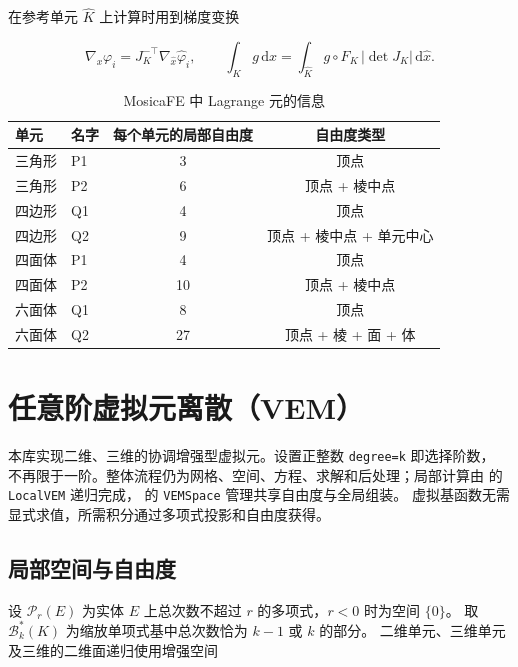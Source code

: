 \documentclass[UTF8,11pt,oneside]{ctexbook}
\theoremstyle{definition}
\theoremstyle{plain}
\newcommand{\mosica}{\textsf{MosicaFE}}
\newcommand{\code}[1]{\texttt{#1}}
\newcommand{\dif}{\,\mathrm{d}}
\begin{document}
在参考单元 $\hat K$ 上计算时用到梯度变换

\begin{equation}
\nabla_x\varphi_i = J_K^{-\top}\nabla_{\hat x}\hat\varphi_i,
\qquad
\int_K g\dif x=\int_{\hat K}g\circ F_K\,|\det J_K|\dif\hat x .
\label{eq:transform}
\end{equation}

\begin{table}[htbp]
\centering
\caption{\mosica{} 中 Lagrange 元的信息}
\label{tab:lagrange}
\begin{lrbox}{\guideTableBox}
\begin{tabular}{@{}llcc@{}}
\toprule
单元 & 名字 & 每个单元的局部自由度 & 自由度类型 \\
\midrule
三角形 & P1 & 3 & 顶点 \\
三角形 & P2 & 6 & 顶点 + 棱中点 \\
四边形 & Q1 & 4 & 顶点 \\
四边形 & Q2 & 9 & 顶点 + 棱中点 + 单元中心 \\
四面体 & P1 & 4 & 顶点 \\
四面体 & P2 & 10 & 顶点 + 棱中点 \\
六面体 & Q1 & 8 & 顶点 \\
六面体 & Q2 & 27 & 顶点 + 棱 + 面 + 体 \\
\bottomrule
\end{tabular}
\end{lrbox}%
\ifdim\wd\guideTableBox>\linewidth
  \resizebox{\linewidth}{!}{\usebox{\guideTableBox}}%
\else\usebox{\guideTableBox}\fi
\end{table}

\section{任意阶虚拟元离散（VEM）}
\label{sec:vem-math}
本库实现二维、三维的协调增强型虚拟元。设置正整数 \code{degree=k} 即选择阶数，
不再限于一阶。整体流程仍为网格、空间、方程、求解和后处理；局部计算由
 的 \code{LocalVEM} 递归完成，
 的 \code{VEMSpace} 管理共享自由度与全局组装。
虚拟基函数无需显式求值，所需积分通过多项式投影和自由度获得。

\subsection{局部空间与自由度}
设 $\mathcal P_r(E)$ 为实体 $E$ 上总次数不超过 $r$ 的多项式，$r<0$ 时为空间 $\{0\}$。
取 $\mathcal B_k^*(K)$ 为缩放单项式基中总次数恰为 $k-1$ 或 $k$ 的部分。
二维单元、三维单元及三维的二维面递归使用增强空间
\end{document}
